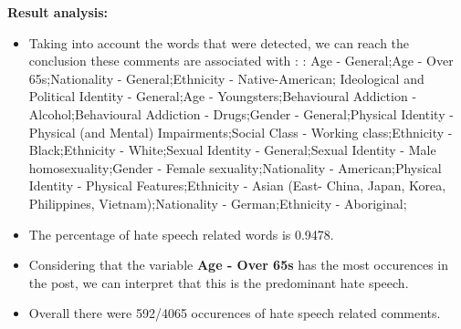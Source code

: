 \documentclass[11pt]{article}
\begin{document}
\textbf{\Large Result analysis:}

\begin{itemize}\item Taking into account the words that were detected, we can reach the conclusion these comments are associated with : : Age - General;Age - Over 65s;Nationality - General;Ethnicity - Native-American; Ideological and Political Identity - General;Age - Youngsters;Behavioural Addiction - Alcohol;Behavioural Addiction - Drugs;Gender - General;Physical Identity - Physical (and Mental) Impairments;Social Class - Working class;Ethnicity - Black;Ethnicity - White;Sexual Identity - General;Sexual Identity - Male homosexuality;Gender - Female sexuality;Nationality - American;Physical Identity - Physical Features;Ethnicity - Asian (East- China, Japan, Korea, Philippines, Vietnam);Nationality - German;Ethnicity - Aboriginal;%

\item The percentage of hate speech related words is 0.9478.

\item Considering that the variable \textbf{Age - Over 65s} has the most occurences in the post, we can interpret that this is the predominant hate speech.

\item Overall there were 592/4065 occurences of hate speech related comments.\end{itemize}
\end{document}
